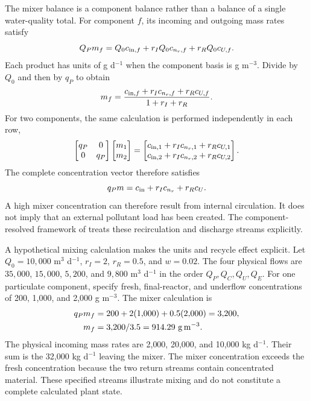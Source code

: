 The mixer balance is a component balance rather than a balance of a single water-quality total. For component $f$, its incoming and outgoing mass rates satisfy
\begin{equation}
\equationname{Scalar mixer equation for one component}
Q_Pm_f=Q_0c_{{\rm in},f}+r_IQ_0c_{n_r,f}+r_RQ_0c_{U,f}.
\end{equation}
Each product has units of g d$^{-1}$ when the component basis is g m$^{-3}$. Divide by $Q_0$ and then by $q_P$ to obtain
\begin{equation}
\equationname{Mixer concentration as a flow-weighted component average}
m_f=\frac{c_{{\rm in},f}+r_Ic_{n_r,f}+r_Rc_{U,f}}{1+r_I+r_R}.
\end{equation}
For two components, the same calculation is performed independently in each row,
\begin{equation}
\equationname{Illustrative two-component mixer matrix equation}
\begin{bmatrix}q_P&0\\0&q_P\end{bmatrix}
\begin{bmatrix}m_1\\m_2\end{bmatrix}
=\begin{bmatrix}c_{{\rm in},1}+r_Ic_{n_r,1}+r_Rc_{U,1}\\
c_{{\rm in},2}+r_Ic_{n_r,2}+r_Rc_{U,2}\end{bmatrix}.
\end{equation}
The complete concentration vector therefore satisfies
\begin{equation}
\equationname{Vector mixer equation for the complete component state}
q_Pm=c_{\rm in}+r_Ic_{n_r}+r_Rc_U.
\label{eq:plant_mixer}
\end{equation}
A high mixer concentration can therefore result from internal circulation. It does not imply that an external pollutant load has been created. The component-resolved framework of \citet{Zhang2026} treats these recirculation and discharge streams explicitly.

A hypothetical mixing calculation makes the units and recycle effect explicit. Let $Q_0=10{,}000$ m$^3$ d$^{-1}$, $r_I=2$, $r_R=0.5$, and $w=0.02$. The four physical flows are $35{,}000$, $15{,}000$, $5{,}200$, and $9{,}800$ m$^3$ d$^{-1}$ in the order $Q_P,Q_C,Q_U,Q_E$. For one particulate component, specify fresh, final-reactor, and underflow concentrations of 200, 1{,}000, and 2{,}000 g m$^{-3}$. The mixer calculation is
\begin{align}
\equationname{Illustrative component inventory entering the mixer}
q_Pm_f&=200+2(1{,}000)+0.5(2{,}000)=3{,}200,\\
\equationname{Illustrative mixer concentration after flow normalization}
m_f&=3{,}200/3.5=914.29\ \mathrm{g\,m^{-3}}.
\end{align}
The physical incoming mass rates are 2{,}000, 20{,}000, and 10{,}000 kg d$^{-1}$. Their sum is the 32{,}000 kg d$^{-1}$ leaving the mixer. The mixer concentration exceeds the fresh concentration because the two return streams contain concentrated material. These specified streams illustrate mixing and do not constitute a complete calculated plant state.

